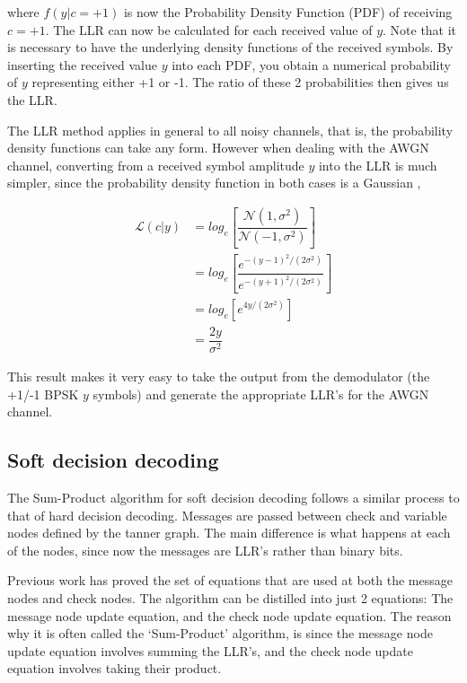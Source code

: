 \documentclass[11pt]{article}
\numberwithin{equation}{subsection}
\begin{document}
\noindent where $f(y|c=+1)$ is now the Probability Density Function (PDF) of receiving $c=+1$. The LLR can now be calculated for each received value of $y$. Note that it is necessary to have the underlying density functions of the received symbols. By inserting the received value $y$ into each PDF, you obtain a numerical probability of $y$ representing either +1 or -1. The ratio of these 2 probabilities then gives us the LLR.

The LLR method applies in general to all noisy channels, that is, the probability density functions can take any form. However when dealing with the AWGN channel, converting from a received symbol amplitude $y$ into the LLR is much simpler, since the probability density function in both cases is a Gaussian \cite{cho2012analysis},

\begin{equation} \label{eq:LLR_awgn}
\begin{aligned}
\mathcal{L}(c|y) &= log_e \left[ \dfrac{\mathcal{N}(1,\sigma^2)} {\mathcal{N}(-1,\sigma^2)} \right] 
\\
&= log_e \left[ \dfrac{e^{-(y-1)^2/(2\sigma^2)}}{e^{-(y+1)^2/(2\sigma^2)}} \right]
\\
&= log_e \left[ e^{4y/(2\sigma^2)} \right]
\\
&= \dfrac{2y}{\sigma^2}
\end{aligned}
\end{equation}

\noindent This result makes it very easy to take the output from the demodulator (the +1/-1 BPSK $y$ symbols) and generate the appropriate LLR's for the AWGN channel.

\subsection{Soft decision decoding}
The Sum-Product algorithm for soft decision decoding follows a similar process to that of hard decision decoding. Messages are passed between check and variable nodes defined by the tanner graph. The main difference is what happens at each of the nodes, since now the messages are LLR's rather than binary bits. 

Previous work \cite{mncisit,gallager1962low,ldpc-tutorial1} has proved the set of equations that are used at both the message nodes and check nodes. The algorithm can be distilled into just 2 equations: The message node update equation, and the check node update equation. The reason why it is often called the `Sum-Product' algorithm, is since the message node update equation involves summing the LLR's, and the check node update equation involves taking their product.
\end{document}
